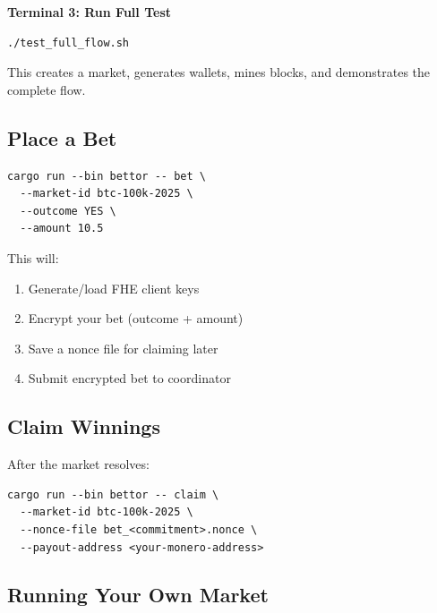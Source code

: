 \documentclass{article}
\begin{document}
\textbf{Terminal 3: Run Full Test}

\begin{verbatim}
./test_full_flow.sh
\end{verbatim}

This creates a market, generates wallets, mines blocks, and demonstrates the complete flow.

\subsection{Place a Bet}

\begin{verbatim}
cargo run --bin bettor -- bet \
  --market-id btc-100k-2025 \
  --outcome YES \
  --amount 10.5
\end{verbatim}

This will:

\begin{enumerate}
\item Generate/load FHE client keys

\item Encrypt your bet (outcome + amount)

\item Save a nonce file for claiming later

\item Submit encrypted bet to coordinator

\end{enumerate}

\subsection{Claim Winnings}

After the market resolves:

\begin{verbatim}
cargo run --bin bettor -- claim \
  --market-id btc-100k-2025 \
  --nonce-file bet_<commitment>.nonce \
  --payout-address <your-monero-address>
\end{verbatim}

\subsection{Running Your Own Market}
\end{document}
